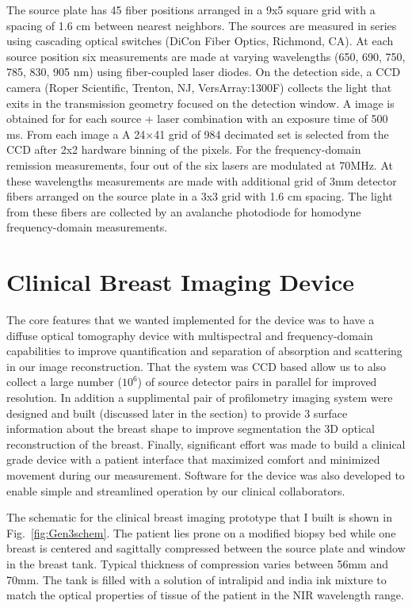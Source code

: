 The source plate has 45 fiber positions arranged in a 9x5 square grid with a spacing of 1.6 cm between nearest neighbors. The sources are measured in series using cascading optical switches (DiCon Fiber Optics, Richmond, CA). At each source position six measurements are made at varying wavelengths (650, 690, 750, 785, 830, 905 nm) using fiber-coupled laser diodes. On the detection side, a CCD camera (Roper Scientific, Trenton, NJ, VersArray:1300F) collects the light that exits in the transmission geometry focused on the detection window. A image is obtained for for each source + laser combination with an exposure time of 500 ms. From each image a  A 24$\times$41 grid of 984  decimated set is selected from the CCD after 2x2 hardware binning of the pixels. For the frequency-domain remission measurements, four out of the six lasers are modulated at 70MHz. At these wavelengths measurements are made with additional grid of 3mm detector fibers arranged on the source plate in a 3x3 grid with 1.6 cm spacing. The light from these fibers are collected by an avalanche photodiode for homodyne frequency-domain measurements.

\section{Clinical Breast Imaging Device}
The core features that we wanted implemented for the device was to have a diffuse optical tomography device with multispectral and frequency-domain capabilities to improve quantification and separation of absorption and scattering in our image reconstruction. That the system was CCD based allow us to also collect a large number ($10^6$) of source detector pairs in parallel for improved resolution. In addition a supplimental pair of profilometry imaging system were designed and built (discussed later in the section) to provide 3 surface information about the breast shape to improve segmentation the 3D optical reconstruction of the breast.  Finally, significant effort was made to build a clinical grade device with a patient interface that maximized comfort and minimized movement during our measurement. Software for the device was also developed to enable simple and streamlined operation by our clinical collaborators.

The schematic for the clinical breast imaging prototype that I built is shown in Fig.~\ref{fig:Gen3schem}. The patient lies prone on a modified biopsy bed while one breast is centered and sagittally compressed between the source plate and window in the breast tank. Typical thickness of compression varies between 56mm and 70mm. The tank is filled with a solution of intralipid and india ink mixture to match the optical properties of tissue of the patient in the NIR wavelength range.

